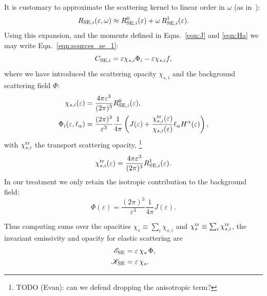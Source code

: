 \documentclass[aps,floatfix,prd,superscriptaddress,twocolumn]{revtex4-1}
\begin{document}
It is customary to approximate the scattering kernel to linear order in
$\omega$ (as in~\cite[Eqn.~4.21]{shib2011-truncated_moment}):
\begin{equation}
  \label{eqn:se_kernel_expansion}
  R_{{\rm SE},i}(\varepsilon,\omega) \approx
  R_{{\rm SE},i}^0(\varepsilon) + \omega \, R_{{\rm SE},i}^1(\varepsilon).
\end{equation}
Using this expansion, and the moments defined in Eqns.~\ref{eqn:J}
and \ref{eqn:Ha} we may write Eqn.~\ref{eqn:sources_se_1}:
\begin{equation}
  \label{eqn:sources_se_2}
  C_{{\rm SE},i}
  = \varepsilon \chi_{s,i} \Phi_i - \varepsilon \chi_{s,i} f,
\end{equation}
where we have introduced the scattering opacity $\chi_{s,i}$
and the background scattering field $\Phi$:
\begin{align}
  \label{eqn:opacity_s}
  \chi_{s,i}(\varepsilon)
  &= \frac{4\pi\varepsilon^3}{(2\pi)^3}R_{{\rm SE},i}^0(\varepsilon), \\
  \label{eqn:background_phi}
  \Phi_i(\varepsilon,\ell_\alpha)
  &= \frac{(2\pi)^3}{\varepsilon^3}\frac{1}{4\pi}
  \left(J(\varepsilon)+
  \frac{\chi^{\rm tr}_{s,i}(\varepsilon)}{\chi_{s,i}(\varepsilon)}
  \ell_\alpha H^\alpha(\varepsilon)\right),
\end{align}
with $\chi^{\rm tr}_{s,i}$ the transport scattering opacity,
\footnote{TODO (Evan): can we defend dropping the anisotropic term?}
\begin{equation}
  \label{eqn:opacity_s_tr}
  \chi^{\rm tr}_{s,i}(\varepsilon)
  = \frac{4\pi\varepsilon^3}{(2\pi)^3}R_{{\rm SE},i}^1(\varepsilon).
\end{equation}
In our treatment we only retain the isotropic contribution to the
background field:
\begin{equation}
  \Phi(\varepsilon)
  = \frac{(2\pi)^3}{\varepsilon^3}\frac{1}{4\pi}
  J(\varepsilon).
\end{equation}

Thus computing sums over the opacities
$\chi_s\equiv\sum_i\chi_{s,i}$ and
$\chi^{\rm tr}_s\equiv\sum_i\chi^{\rm tr}_{s,i}$,
the invariant emissivity and opacity for elastic scattering are
\begin{align}
  \label{eqn:se_emissivity_summed}
  \mathscr{E}_{\rm SE}
  &= \varepsilon \, \chi_s \, \Phi, \\
  \label{eqn:se_opacity_summed}
  \mathscr{K}_{\rm SE}
  &= \varepsilon \, \chi_s.
\end{align}
\end{document}
